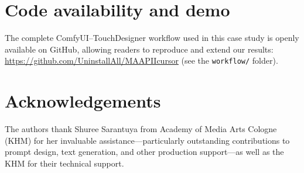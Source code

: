 \documentclass[sigconf,nonacm]{acmart}
\newif\ifanonymous
\begin{document}

\section*{Code availability and demo}
The complete ComfyUI–TouchDesigner workflow used in this case study is openly available on GitHub, allowing readers to reproduce and extend our results: \url{https://github.com/UninstallAll/MAAPIIcursor} (see the \texttt{workflow/} folder).


\ifanonymous
  \section*{Acknowledgements}
  Acknowledgments have been removed for anonymous review and will be restored in the camera-ready version.
\else
    \section*{Acknowledgements}
    The authors thank Shuree Sarantuya from Academy of Media Arts Cologne (KHM) for her invaluable assistance—particularly outstanding contributions to prompt design, text generation, and other production support—as well as the KHM for their technical support.
\fi



\clearpage 

 
\end{document}

